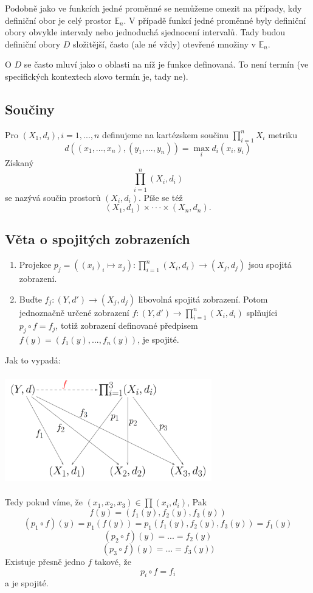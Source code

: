 \documentclass[../main.tex]{subfiles}
\begin{document}
\noindent
\hspace{1.2mm}
Podobně jako ve funkcích jedné proměnné se nemůžeme omezit na případy, kdy definiční obor je celý prostor $\mathbb{E}_n$.  
V případě funkcí jedné proměnné byly definiční obory obvykle intervaly nebo jednoduchá sjednocení intervalů. Tady budou definiční
obory $D$ složitější, často (ale né vždy) otevřené množiny v $\mathbb{E}_n$.

O $D$ se často mluví jako o oblasti na níž je funkce definovaná. To není termín (ve specifických kontextech slovo  termín 
je, tady ne).

\subsection{Součiny}
\hspace{1.2mm}
Pro $(X_1,d_i), i = 1,...,n$ definujeme na kartézskem součinu $\prod^n_{i=1}X_i$ metriku
\[d((x_1,...,x_n),(y_1,...,y_n)) = \max_i d_i(x_i,y_i)\]
Získaný
\[\prod^n_{i=1}(X_i,d_i)\]
se nazývá součin prostorů $(X_i, d_i)$. Píše se též 
\[(X_1,d_1) \times \cdot \cdot \cdot \times (X_n,d_n).\]

\subsection{Věta o spojitých zobrazeních}
\begin{enumerate}
\item Projekce $p_j = ((x_i)_i \mapsto x_j) : \prod^n_{i=1}(X_i,d_i) \rightarrow (X_j,d_j)$ jsou spojitá zobrazení.

\item Buďte $f_j:(Y,d') \rightarrow (X_j,d_j)$ libovolná spojitá zobrazení. Potom jednoznačně určené zobrazení 
$f:(Y,d') \rightarrow \prod^n_{i=1}(X_i,d_i)$ splňujíci $p_j \circ f = f_j$, totiž zobrazení definované předpisem
$f(y) = (f_1(y),...,f_n(y))$, je spojité.
\end{enumerate}
Jak to vypadá:
\begin{center}
\includegraphics[width=9cm,height=4.8cm]{ipkm.png}
\end{center}

Tedy pokud víme, že $(x_1,x_2,x_3)\in \prod (x_i,d_i)$, Pak
\[f(y) = (f_1(y),f_2(y),f_3(y))\]
\[(p_1\circ f)(y) = p_1(f(y)) = p_1(f_1(y),f_2(y),f_3(y))=f_1(y)\]
\[(p_2\circ f)(y) = ... = f_2(y)\]
\[(p_3\circ f)(y) = ... = f_3(y))\]
Existuje přesně jedno $f$ takové, že 
\[p_i \circ f = f_i\]
a je spojité.
\end{document}
